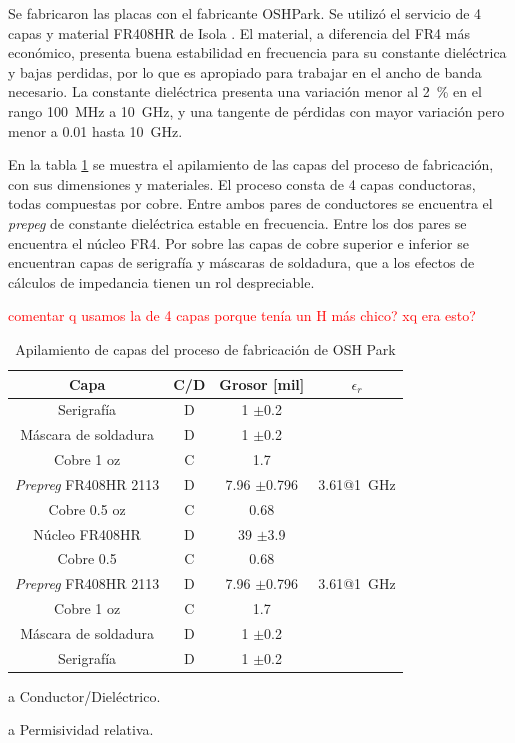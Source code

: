 Se fabricaron las placas con el fabricante OSHPark. Se utilizó el servicio de 4
capas y material FR408HR de Isola \cite{fr408_datasheet}. El material, a
diferencia del FR4 más económico, presenta buena estabilidad en frecuencia para
su constante dieléctrica y bajas perdidas, por lo que es apropiado para
trabajar en el ancho de banda necesario. La constante dieléctrica presenta una
variación menor al \qty{2}{\percent} en el rango \qty{100}{\mega\hertz} a
\qty{10}{\giga\hertz}, y una tangente de pérdidas con mayor variación pero menor
a \num{0.01} hasta \qty{10}{\giga\hertz}.

En la tabla \ref{tab:oshpark_4_layer_stackup} se muestra el apilamiento de las
capas del proceso de fabricación, con sus dimensiones y materiales. El proceso
consta de 4 capas conductoras, todas compuestas por cobre. Entre ambos pares de
conductores se encuentra el \textit{prepeg} de constante dieléctrica estable en
frecuencia. Entre los dos pares se encuentra el núcleo FR4. Por sobre las capas de
cobre superior e inferior se encuentran capas de serigrafía y máscaras de
soldadura, que a los efectos de cálculos de impedancia tienen un rol
despreciable.

\textcolor{red}{comentar q usamos la de 4 capas porque tenía un H más chico? xq
era esto?}

\begin{table}[htbp]
\centering
\begin{threeparttable}[b]
    \begin{tabular}{c|c|c|c}
        Capa & C/D \tnote{a} & Grosor [mil]  & $\epsilon_r$ \tnote{b} \\
        \hline
        Serigrafía & D & 1 $\pm$0.2 & \\
        Máscara de soldadura & D & 1 $\pm$0.2 & \\
        Cobre 1 oz & C & 1.7 \\
        \textit{Prepreg} FR408HR 2113  & D & 7.96 $\pm$0.796 &
        3.61@\qty{1}{\giga\hertz} \\
        Cobre 0.5 oz & C & 0.68 & \\
        Núcleo FR408HR & D & 39 $\pm$3.9 & \\
        Cobre 0.5 & C & 0.68 \\
        \textit{Prepreg} FR408HR 2113 & D & 7.96 $\pm$0.796 &
        3.61@\qty{1}{\giga\hertz}\\
        Cobre 1 oz & C & 1.7 & \\
        Máscara de soldadura & D & 1 $\pm$0.2 & \\
        Serigrafía & D & 1 $\pm$0.2 & \\
    \end{tabular}
    \begin{tablenotes}
        \item [a] Conductor/Dieléctrico.
        \item [a] Permisividad relativa.
    \end{tablenotes}
\end{threeparttable}
\caption{Apilamiento de capas del proceso de fabricación de OSH Park}
\label{tab:oshpark_4_layer_stackup}
\end{table}

